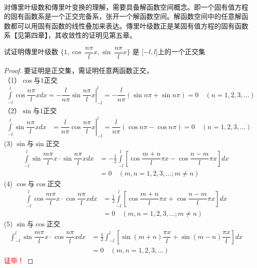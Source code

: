 ~~\\ 
\begin{hint}
	对傳里叶级数和傳里叶变换的理解，需要具备解函数空间概念。即一个固有值方程的固有函数系是一个正交完备系，张开一个解函数空间。解函数空间中的任意解函数都可以用固有函数的线性叠加来表达。傳里叶级数正是某固有值方程的固有函数系【见第四章】，其收敛性的证明见第五章。
\end{hint}
\begin{example}
试证明傳里叶级数 $\displaystyle \{1, \cos~ \dfrac{n\pi}{l} x,\sin~ \dfrac{n\pi}{l} x \}$ 是 [$-l,l$]上的一个正交集
\end{example}
\begin{proof}要证明是正交集，需证明任意两函数正交，\\
	（1）$\cos$与$1$正交
		$$\begin{aligned}
			\int\limits_{-l}^l \cos \dfrac{n\pi}{l} x d x = -\dfrac{l}{n\pi}\left.\sin \dfrac{n\pi}{l} x\right\vert _{-l}^l = -\dfrac{l}{n\pi}(\sin n\pi + \sin n\pi) =0 \quad(n=1,2,3, \ldots )
			\end{aligned}$$
	（2）$\sin$与$1$正交	
	$$\begin{aligned}
		\int\limits_{-l}^l \sin \dfrac{n\pi}{l} x d x &= \left.\dfrac{l}{n\pi}\cos \dfrac{n\pi}{l} x\right\vert _{-l}^l = \dfrac{l}{n\pi}(\cos n\pi - \cos n\pi) =0 \quad(n=1,2,3, \ldots )
		\end{aligned}$$
	(3) $\sin$与$\sin $正交
	$$
	\begin{aligned}
			\int\limits_{-l}^l \sin \dfrac{m\pi}{l} x \cdot \sin \dfrac{n\pi}{l} x d x
			&= -\frac{1}{2} \int\limits_{-l}^l\left[\cos \dfrac{m+n}{l} \pi x - \cos \dfrac{n-m}{l}\pi x \right]d x\\
			&=0  \quad(m, n=1,2,3, \ldots ; m \neq n)
			\end{aligned}  
	$$ 
	(4) $\cos$与$\cos $正交
	$$
	\begin{aligned}
		\int\limits_{-l}^l \cos \dfrac{m\pi}{l} x \cdot \cos \dfrac{n\pi}{l} x d x
		&= \frac{1}{2} \int\limits_{-l}^l\left[\cos \dfrac{m+n}{l} \pi x + \cos \dfrac{n-m}{l}\pi x \right]d x\\
		&=0  \quad(m, n=1,2,3, \ldots ; m \neq n)
		\end{aligned} 
		$$ 
	(5) $\sin $与$\cos$正交	
$$
\begin{aligned}
\int_{-l}^l \sin \dfrac{m\pi}{l} x \cdot \cos \dfrac{n\pi}{l} x d x & =\frac{1}{2} \int_{-l}^l[\sin (m+n) \dfrac{\pi x}{l}+\sin (m-n) \dfrac{\pi x}{l}] d x \\
&=0 \quad(m, n=1,2,3, \ldots)
\end{aligned}
$$
\textcolor{red}{证毕！}
\end{proof}
 
